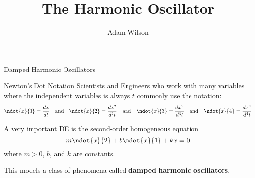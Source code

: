 \documentclass{beamer}
\title[MATH 2250 - Section 4.1]{The Harmonic Oscillator}
\author{Adam Wilson}
\institute{Salt Lake Community College}
\date{}
\begin{document}
\begin{frame}
  \titlepage
\end{frame}

\begin{frame}{Damped Harmonic Oscillators}
\begin{block}{Newton's Dot Notation}
Scientists and Engineers who work with many variables where the independent variables is always $t$ commonly use the notation:
\begin{equation*}
\ndot{x}{1}=\dfrac{dx}{dt}
\quad\text{and}\quad
\ndot{x}{2}=\dfrac{dx^2}{d^2t}
\quad\text{and}\quad
\ndot{x}{3}=\dfrac{dx^3}{d^3t}
\quad\text{and}\quad
\ndot{x}{4}=\dfrac{dx^4}{d^4t}
\end{equation*}
\end{block}\pause

\begin{definition}
A very important DE is the second-order homogeneous equation
\begin{equation*}
m\ndot{x}{2}+b\ndot{x}{1}+kx=0
\end{equation*}
where $m>0$, $b$, and $k$ are constants.

This models a class of phenomena called \textbf{damped harmonic oscillators}.  
\end{definition}
\end{frame}
\end{document}
